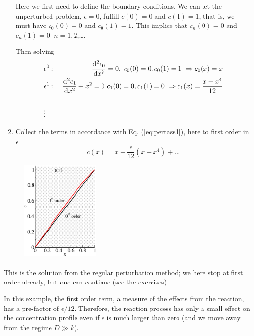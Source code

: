 \begin{enumerate}
{    Here we first need to define the boundary conditions. We can let the unperturbed
    problem, $\epsilon=0$, fulfill $c(0)=0$ and $c(1)=1$, that is, we must have
    $c_0(0)=0$ and $c_0(1)=1$. This implies that $c_n(0)=0$ and $c_n(1)=0$,
    $n=1,2$,\ldots.

    Then solving
    \begin{eqnarray}
      &\epsilon^0:& \ \frac{\mathrm{d}^2 c_0}{\mathrm{d} x^2} = 0, \
                    c_0(0)=0, c_0(1)=1 \ \Rightarrow c_0(x) = x
                    \label{eq:p11}\\
      &\epsilon^1:& \ \frac{\mathrm{d}^2 c_1}{\mathrm{d} x^2} + x^2 = 0 \
                    c_1(0)=0, c_1(1)=0 \ \Rightarrow c_1(x) = \frac{x-x^4}{12}
                    \nonumber \\ \label{eq:p12}\\
      &\vdots& \nonumber
    \end{eqnarray}
  }
\item{
    Collect the terms in accordance with Eq. (\ref{eq:pertass1}), here
    to first order in $\epsilon$
    \begin{equation}
      c(x) = x + \frac{\epsilon}{12}(x-x^4) + \dots
      \end{equation}
    }
\end{enumerate}    
\begin{figure}
	\includegraphics[width=0.35\textwidth]{figs/perturb_one.eps}
\end{figure}
\paragraph{}
\vspace*{-\parskip}
This is the solution from the regular perturbation method; we here stop at first order already, but 
one can continue (see the exercises). 

In this example, the first order term, a measure of the effects from the reaction,
has a pre-factor of $\epsilon/12$. Therefore, the reaction process has only a small effect 
on the concentration profile even if $\epsilon$ is much larger than zero (and we move away from 
the regime $D \gg k$). 


